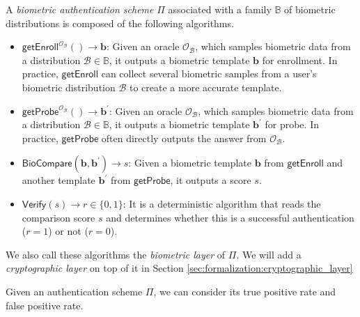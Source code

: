 \begin{definition}

A \emph{biometric authentication scheme} $\Pi$ associated with a family $\mathbb{B}$ of biometric distributions is composed of the following algorithms.

\begin{itemize}

	\item $\mathsf{getEnroll}^{\mathcal{O}_{\mathcal{B}}}() \to \mathbf{b}$: Given an oracle $\mathcal{O}_{\mathcal{B}}$, which samples biometric data from a distribution $\mathcal{B} \in \mathbb{B}$, it outputs a biometric template $\mathbf{b}$ for enrollment. In practice, $\mathsf{getEnroll}$ can collect several biometric samples from a user's biometric distribution $\mathcal{B}$ to create a more accurate template.

	\item $\mathsf{getProbe}^{\mathcal{O}_{\mathcal{B}}}() \to \mathbf{b}^\prime$: Given an oracle $\mathcal{O}_{\mathcal{B}}$, which samples biometric data from a distribution $\mathcal{B} \in \mathbb{B}$, it outputs a biometric template $\mathbf{b}^\prime$ for probe. In practice, $\mathsf{getProbe}$ often directly outputs the answer from $\mathcal{O}_{\mathcal{B}}$.

	\item $\mathsf{BioCompare}(\mathbf{b}, \mathbf{b}^\prime) \to s$: Given a biometric template $\mathbf{b}$ from $\mathsf{getEnroll}$ and another template $\mathbf{b}^\prime$ from $\mathsf{getProbe}$, it outputs a score $s$.

	\item $\mathsf{Verify}(s) \to r \in \{0,1\}$: It is a deterministic algorithm that reads the comparison score $s$ and determines whether this is a successful authentication ($r = 1$) or not ($r = 0$).

\end{itemize}
We also call these algorithms the \emph{biometric layer} of $\Pi$. We will add a \emph{cryptographic layer} on top of it in Section \ref{sec:formalization:cryptographic_layer}

\end{definition}


Given an authentication scheme $\Pi$, we can consider its true positive rate and false positive rate.

